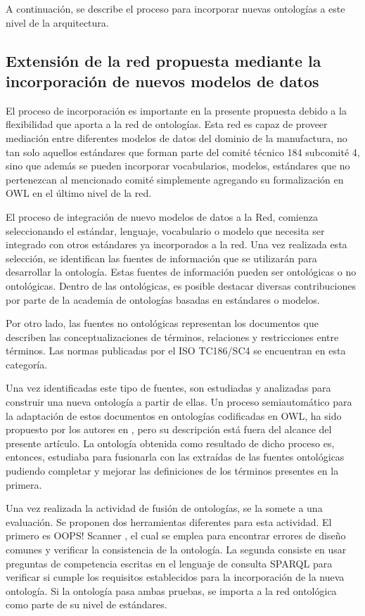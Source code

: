 \documentclass[journal]{IEEEtran}
\begin{document}
A continuaci\'on, se describe el proceso para incorporar nuevas ontolog\'ias a este nivel de la arquitectura. 

\subsection{Extensi\'on de la red propuesta mediante la incorporaci\'on de nuevos modelos de datos}

El proceso de incorporaci\'on es importante en la presente propuesta debido a la flexibilidad que aporta a la red de ontolog\'ias. Esta red es capaz de proveer mediaci\'on entre diferentes modelos de datos del dominio de la manufactura, no tan solo aquellos est\'andares que forman parte del comit\'e t\'ecnico 184 subcomit\'e 4, sino que adem\'as se pueden incorporar vocabularios, modelos, est\'andares que no pertenezcan al mencionado comit\'e simplemente agregando su formalizaci\'on en OWL en el \'ultimo nivel de la red. 


El proceso de integraci\'on de nuevo modelos de datos a la Red, comienza seleccionando el est\'andar, lenguaje, vocabulario o modelo que necesita ser integrado con otros est\'andares ya incorporados a la red. Una vez realizada esta selecci\'on, se identifican las fuentes de informaci\'on que se utilizar\'an para desarrollar la ontolog\'ia. Estas fuentes de informaci\'on pueden ser ontol\'ogicas o no ontol\'ogicas. Dentro de las ontol\'ogicas, es posible destacar diversas contribuciones por parte de la academia de ontolog\'ias basadas en est\'andares o modelos.

Por otro lado, las fuentes no ontol\'ogicas representan los documentos que describen las conceptualizaciones de t\'erminos, relaciones y restricciones entre t\'erminos. Las normas publicadas por el ISO TC186/SC4 se encuentran en esta categor\'ia. 

Una vez identificadas este tipo de fuentes, son estudiadas y analizadas para construir una nueva ontolog\'ia a partir de ellas. Un proceso semiautom\'atico para la adaptaci\'on de estos documentos en ontolog\'ias codificadas en OWL, ha sido propuesto por los autores en \cite{Fraga2017}, pero su descripci\'on est\'a fuera del alcance del presente art\'iculo. La ontolog\'ia obtenida como resultado de dicho proceso es, entonces, estudiaba para fusionarla con las extra\'idas de las fuentes ontol\'ogicas pudiendo completar y mejorar las definiciones de los t\'erminos presentes en la primera.

Una vez realizada la actividad de fusi\'on de ontolog\'ias, se la somete a una evaluaci\'on. Se proponen dos herramientas diferentes para esta actividad. El primero es OOPS! Scanner \cite{Poveda-Villalon2009a}, el cual se emplea para encontrar errores de diseño comunes y verificar la consistencia de la ontolog\'ia. La segunda consiste en usar preguntas de competencia escritas en el lenguaje de consulta SPARQL para verificar si cumple los requisitos establecidos para la incorporaci\'on de la nueva ontolog\'ia. Si la ontolog\'ia pasa ambas pruebas, se importa a la red ontol\'ogica como parte de su nivel de est\'andares.
\end{document}

